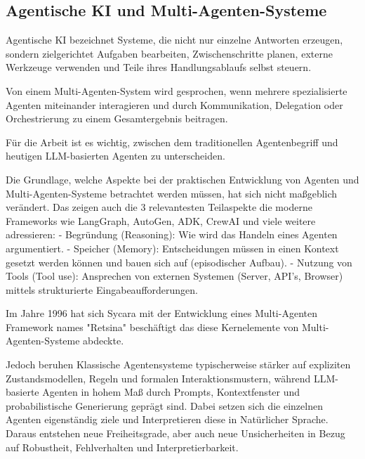 \subsection{Agentische KI und Multi-Agenten-Systeme}

Agentische KI bezeichnet Systeme, die nicht nur einzelne Antworten erzeugen, sondern zielgerichtet Aufgaben bearbeiten, Zwischenschritte planen, externe Werkzeuge verwenden und Teile ihres Handlungsablaufs selbst steuern. \cite{wooldridge_intelligent_1995,jennings_commitments_1993}

Von einem Multi-Agenten-System wird gesprochen, wenn mehrere spezialisierte Agenten miteinander interagieren und durch Kommunikation, Delegation oder Orchestrierung zu einem Gesamtergebnis beitragen.\cite{jennings_roadmap_1998,wooldridge_introduction_2002,russell_artificial_2022}

Für die Arbeit ist es wichtig, zwischen dem traditionellen Agentenbegriff und heutigen LLM-basierten Agenten zu unterscheiden. \cite{russell_artificial_2022,botti_agentic_2025} 

Die Grundlage, welche Aspekte bei der praktischen Entwicklung von Agenten und Multi-Agenten-Systeme betrachtet werden müssen, hat sich nicht maßgeblich verändert. Das zeigen auch die 3 relevantesten Teilaspekte \cite{russell_artificial_2022,jennings_roadmap_1998} die moderne Frameworks wie LangGraph, AutoGen, ADK, CrewAI und viele weitere adressieren:
- Begründung (Reasoning): Wie wird das Handeln eines Agenten argumentiert.
- Speicher (Memory): Entscheidungen müssen in einen Kontext gesetzt werden können und bauen sich auf (episodischer Aufbau).
- Nutzung von Tools (Tool use): Ansprechen von externen Systemen (Server, API's, Browser) mittels strukturierte Eingabeaufforderungen.

Im Jahre 1996 hat sich Sycara mit der Entwicklung eines Multi-Agenten Framework names "Retsina" beschäftigt das diese Kernelemente von Multi-Agenten-Systeme abdeckte. \cite{sycara_distributed_1996} 

Jedoch beruhen Klassische Agentensysteme typischerweise stärker auf expliziten Zustandsmodellen, Regeln und formalen Interaktionsmustern, während LLM-basierte Agenten in hohem Maß durch Prompts, Kontextfenster und probabilistische Generierung geprägt sind. \cite{wooldridge_intelligent_1995,jennings_roadmap_1998, botti_agentic_2025}
Dabei setzen sich die einzelnen Agenten eigenständig ziele und Interpretieren diese in Natürlicher Sprache. Daraus entstehen neue Freiheitsgrade, aber auch neue Unsicherheiten in Bezug auf Robustheit, Fehlverhalten und Interpretierbarkeit.  \cite{wang_large_2026, raza_trism_2026}

